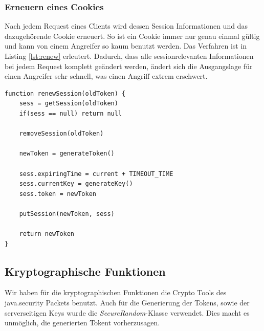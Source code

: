 \subsubsection{Erneuern eines Cookies}

Nach jedem Request eines Clients wird dessen Session Informationen und das dazugehörende Cookie
erneuert. So ist ein Cookie immer nur genau einmal gültig und kann von einem Angreifer so kaum 
benutzt werden. Das Verfahren ist in Listing \ref{lst:renew} erleutert. Dadurch, dass alle 
sessionrelevanten Informationen bei jedem Request komplett geändert werden, ändert sich die
Ausgangslage für einen Angreifer sehr schnell, was einen Angriff extrem erschwert.
\newline
\begin{lstlisting}[caption=Erneuern einer Session,label={lst:renew}]
function renewSession(oldToken) {
    sess = getSession(oldToken)
    if(sess == null) return null

    removeSession(oldToken)

    newToken = generateToken()

    sess.expiringTime = current + TIMEOUT_TIME
    sess.currentKey = generateKey()
    sess.token = newToken

    putSession(newToken, sess)

    return newToken
}
\end{lstlisting}

\subsection{Kryptographische Funktionen}

Wir haben für die kryptographischen Funktionen die Crypto Tools des java.security Packets benutzt. Auch für die Generierung
der Tokens, sowie der serverseitigen Keys wurde die \textit{SecureRandom}-Klasse verwendet. Dies macht es unmöglich, die
generierten Tokent vorherzusagen.
